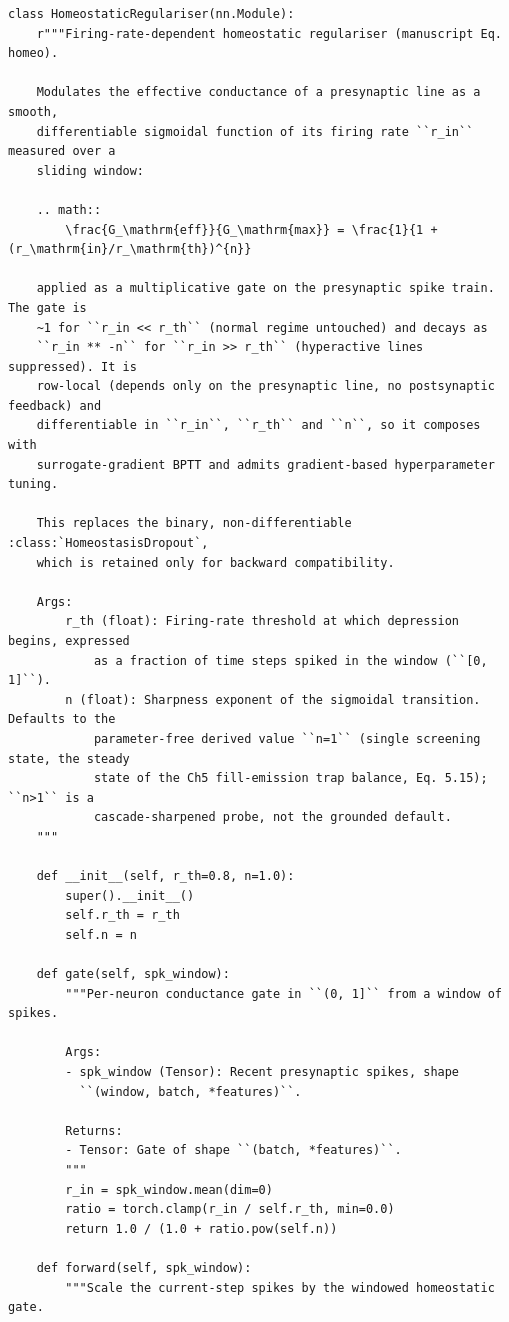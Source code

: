 \begin{lstlisting}[caption={mnn\_torch/layers.py},label={lst:mnn-src-layers}]
class HomeostaticRegulariser(nn.Module):
    r"""Firing-rate-dependent homeostatic regulariser (manuscript Eq. homeo).

    Modulates the effective conductance of a presynaptic line as a smooth,
    differentiable sigmoidal function of its firing rate ``r_in`` measured over a
    sliding window:

    .. math::
        \frac{G_\mathrm{eff}}{G_\mathrm{max}} = \frac{1}{1 + (r_\mathrm{in}/r_\mathrm{th})^{n}}

    applied as a multiplicative gate on the presynaptic spike train. The gate is
    ~1 for ``r_in << r_th`` (normal regime untouched) and decays as
    ``r_in ** -n`` for ``r_in >> r_th`` (hyperactive lines suppressed). It is
    row-local (depends only on the presynaptic line, no postsynaptic feedback) and
    differentiable in ``r_in``, ``r_th`` and ``n``, so it composes with
    surrogate-gradient BPTT and admits gradient-based hyperparameter tuning.

    This replaces the binary, non-differentiable :class:`HomeostasisDropout`,
    which is retained only for backward compatibility.

    Args:
        r_th (float): Firing-rate threshold at which depression begins, expressed
            as a fraction of time steps spiked in the window (``[0, 1]``).
        n (float): Sharpness exponent of the sigmoidal transition. Defaults to the
            parameter-free derived value ``n=1`` (single screening state, the steady
            state of the Ch5 fill-emission trap balance, Eq. 5.15); ``n>1`` is a
            cascade-sharpened probe, not the grounded default.
    """

    def __init__(self, r_th=0.8, n=1.0):
        super().__init__()
        self.r_th = r_th
        self.n = n

    def gate(self, spk_window):
        """Per-neuron conductance gate in ``(0, 1]`` from a window of spikes.

        Args:
        - spk_window (Tensor): Recent presynaptic spikes, shape
          ``(window, batch, *features)``.

        Returns:
        - Tensor: Gate of shape ``(batch, *features)``.
        """
        r_in = spk_window.mean(dim=0)
        ratio = torch.clamp(r_in / self.r_th, min=0.0)
        return 1.0 / (1.0 + ratio.pow(self.n))

    def forward(self, spk_window):
        """Scale the current-step spikes by the windowed homeostatic gate.


\end{lstlisting}
